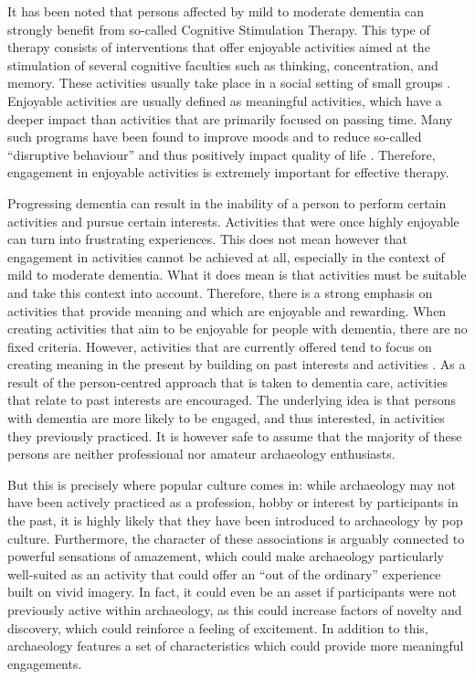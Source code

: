 	
	It has been noted that persons affected by mild to moderate dementia can strongly benefit from so-called Cognitive Stimulation Therapy. This type of therapy consists of interventions that offer enjoyable activities aimed at the stimulation of several cognitive faculties such as thinking, concentration, and memory. These activities usually take place in a social setting of small groups \parencite{Woods_2012}. Enjoyable activities are usually defined as meaningful activities, which have a deeper impact than activities that are primarily focused on passing time. Many such programs have been found to improve moods and to reduce so-called “disruptive behaviour” and thus positively impact quality of life \parencite[124]{Teri_1992}. Therefore, engagement in enjoyable activities is extremely important for effective therapy. 
	
Progressing dementia can result in the inability of a person to perform certain activities and pursue certain interests. Activities that were once highly enjoyable can turn into frustrating experiences. This does not mean however that engagement in activities cannot be achieved at all, especially in the context of mild to moderate dementia. What it does mean is that activities must be suitable and take this context into account. Therefore, there is a strong emphasis on activities that provide meaning and which are enjoyable and rewarding. When creating activities that aim to be enjoyable for people with dementia, there are no fixed criteria. However, activities that are currently offered tend to focus on creating meaning in the present by building on past interests and activities \parencite{Association_2015}. As a result of the person-centred approach that is taken to dementia care, activities that relate to past interests are encouraged. The underlying idea is that persons with dementia are more likely to be engaged, and thus interested, in activities they previously practiced. It is however safe to assume that the majority of these persons are neither professional nor amateur archaeology enthusiasts. 		
	
	But this is precisely where popular culture comes in: while archaeology may not have been actively practiced as a profession, hobby or interest by participants in the past, it is highly likely that they have been introduced to archaeology by pop culture. Furthermore, the character of these associations is arguably connected to powerful sensations of amazement, which could make archaeology particularly well-suited as an activity that could offer an “out of the ordinary” experience built on vivid imagery. In fact, it could even be an asset if participants were not previously active within archaeology, as this could increase factors of novelty and discovery, which could reinforce a feeling of excitement. In addition to this, archaeology features a set of characteristics which could provide more meaningful engagements. 	
	
